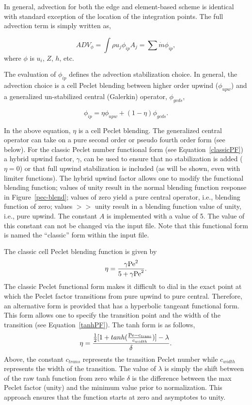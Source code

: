 In general, advection for both the edge and element-based
scheme is identical with standard exception of the location of the integration
points. The full advection term is simply written as,

\begin{equation}
  ADV_{\phi} = \int \rho u_j \phi_{ip} A_j = \sum \dot{m} \phi_{ip},
\label{advForm}
\end{equation}
%
where $\phi$ is $u_i$, $Z$, $h$, etc.

The evaluation of $\phi_{ip}$ defines the advection stabilization choice. 
In general, the advection choice is a cell Peclet blending between higher
order upwind ($\phi_{upw}$) and a generalized un-stabilized central 
(Galerkin) operator, $\phi_{gcds}$,

\begin{equation}
  \phi_{ip} = \eta \phi_{upw} + (1-\eta)\phi_{gcds}.
\end{equation}
\label{advPhiIP}
%

In the above equation, $\eta$ is a cell Peclet blending. The generalized
central operator can take on a pure second order or pseudo fourth order form (see below). 
For the classic Peclet number functional form (see Equation~\ref{classicPF}) 
a hybrid upwind factor, $\gamma$, can be used to 
ensure that no stabilization is added ($\eta = 0$) or that full upwind stabilization is included (as will be shown, 
even with limiter functions). The hybrid upwind factor allows one to modify the functional
blending function; values of unity result in the normal blending function 
response in  Figure~\ref{pec-blend}; values of zero yield
a pure central operator, i.e., blending function of zero; values $>>$ unity result 
in a blending function value of unity, i.e., pure upwind. The constant $A$
is implemented with a value of 5. The value of this constant can not be changed
via the input file. Note that this functional form is named the ``classic'' form
within the input file.

The classic cell Peclet blending function is given by
\begin{equation}
  \eta = \frac {{\gamma \rm Pe}^2} {5 + {\gamma \rm Pe}^2}.
\label{classicPF}
\end{equation}
The classic Peclet functional form makes it difficult to dial in the exact
point at which the Peclet factor transitions from pure upwind to pure central. 
Therefore, an alternative form is provided that has a hyperbolic tangeant 
functional form. This form allows one to specify the transition point and 
the width of the transition (see Equation~\ref{tanhPF}).
The tanh form is as follows,
\begin{equation}
  \eta = \frac {\frac {1}{2}[1+tanh(\frac{\rm Pe - c_{trans}}{c_{width}})] -\lambda}{\delta}.
\label{tanhPF}
\end{equation}
Above, the constant $c_{trans}$ represents the transition Peclet number while $c_{width}$ represents the width of 
the transition. The value of $\lambda$ is simply the shift between of the raw tanh function
from zero while $\delta$ is the difference between the max Peclet factor (unity) and the minimum value
prior to normalization. This approach ensures that the function starts at zero and asymptotes to unity. 

